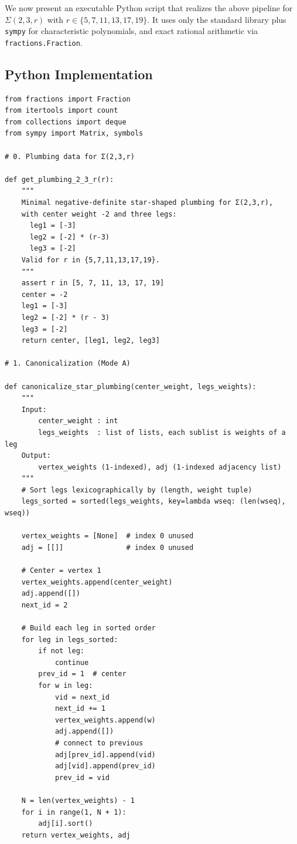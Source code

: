 \documentclass[11pt]{article}
\begin{document}
We now present an executable Python script that realizes the above pipeline for $\Sigma(2,3,r)$ with $r\in\{5,7,11,13,17,19\}$. It uses only the standard library plus \texttt{sympy} for characteristic polynomials, and exact rational arithmetic via \texttt{fractions.Fraction}.

\subsection*{Python Implementation}

\begin{verbatim}
from fractions import Fraction
from itertools import count
from collections import deque
from sympy import Matrix, symbols

# 0. Plumbing data for Σ(2,3,r)

def get_plumbing_2_3_r(r):
    """
    Minimal negative-definite star-shaped plumbing for Σ(2,3,r),
    with center weight -2 and three legs:
      leg1 = [-3]
      leg2 = [-2] * (r-3)
      leg3 = [-2]
    Valid for r in {5,7,11,13,17,19}.
    """
    assert r in [5, 7, 11, 13, 17, 19]
    center = -2
    leg1 = [-3]
    leg2 = [-2] * (r - 3)
    leg3 = [-2]
    return center, [leg1, leg2, leg3]

# 1. Canonicalization (Mode A)

def canonicalize_star_plumbing(center_weight, legs_weights):
    """
    Input:
        center_weight : int
        legs_weights  : list of lists, each sublist is weights of a leg
    Output:
        vertex_weights (1-indexed), adj (1-indexed adjacency list)
    """
    # Sort legs lexicographically by (length, weight tuple)
    legs_sorted = sorted(legs_weights, key=lambda wseq: (len(wseq), wseq))

    vertex_weights = [None]  # index 0 unused
    adj = [[]]               # index 0 unused

    # Center = vertex 1
    vertex_weights.append(center_weight)
    adj.append([])
    next_id = 2

    # Build each leg in sorted order
    for leg in legs_sorted:
        if not leg:
            continue
        prev_id = 1  # center
        for w in leg:
            vid = next_id
            next_id += 1
            vertex_weights.append(w)
            adj.append([])
            # connect to previous
            adj[prev_id].append(vid)
            adj[vid].append(prev_id)
            prev_id = vid

    N = len(vertex_weights) - 1
    for i in range(1, N + 1):
        adj[i].sort()
    return vertex_weights, adj


\end{verbatim}
\end{document}
